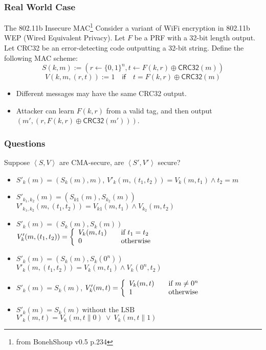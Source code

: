 \begin{frame}\frametitle{Real World Case}
\begin{exampleblock}{The 802.11b Insecure MAC\footnote{from 
BonehShoup v0.5 p.234}}
Consider a variant of WiFi encryption in 802.11b WEP (Wired Equivalent Privacy). Let $F$ be a PRF with a 32-bit length output. Let CRC32 be an error-detecting code outputting a 32-bit string. Define the following MAC scheme:
\[ S(k, m) := ( r \gets \{ 0,1 \}^n, t \gets F(k, r) \oplus \mathsf{CRC32}(m) )
\]
\[ V(k, m, (r, t)) := 1 \quad \mathsf{if} \quad t = F(k, r) \oplus \mathsf{CRC32}(m) 
\]
\begin{itemize}
\item Different messages may have the same CRC32 output.
\item Attacker can learn $F(k, r)$ from a valid tag, and then output $(m', (r, F(k, r) \oplus \mathsf{CRC32}(m')))$.
\end{itemize}
\end{exampleblock}
\end{frame}
\begin{frame}\frametitle{Questions}
\begin{exampleblock}{Suppose $\left<S, V\right>$ are CMA-secure,  are $\left<S', V'\right>$ secure?}
\begin{itemize}
\item $S'_{k}(m) = (S_{k}(m),m)$, 
$V'_{k}(m,(t_{1},t_{2})) = V_{k}(m,t_{1}) \land t_{2} = m$
\item $S'_{k_{1},k_{2}}(m) = (S_{k1}(m),S_{k_{2}}(m))$\\
$V'_{k_{1},k_{2}}(m,(t_{1},t_{2})) = V_{k1}(m,t_{1}) \land V_{k_{2}}(m,t_{2})$
\item $S'_{k}(m) = (S_{k}(m),S_{k}(m))$\\
$ V'_{k}(m,(t_{1},t_{2})) = \left\{
  \begin{array}{l l}
    V_{k}(m,t_{1}) & \quad \text{if $t_{1}=t_{2}$}\\
    0 & \quad \text{otherwise}\\
  \end{array} \right. $
\item $S'_{k}(m) = (S_{k}(m),S_{k}(0^{n}))$\\
$ V'_{k}(m,(t_{1},t_{2})) = V_{k}(m,t_{1}) \land  V_{k}(0^{n},t_{2})$
\item $S'_{k}(m) = S_{k}(m)$, 
$ V'_{k}(m,t) = \left\{ 
  \begin{array}{l l}
    V_{k}(m,t) & \quad \text{if $m \neq 0^{n}$}\\
    1 & \quad \text{otherwise}\\
  \end{array} \right. $
\item $S'_{k}(m) = S_{k}(m)\ \text{without the LSB}$ \\
$V'_{k}(m,t) = V_{k}(m,t\| 0)\ \lor \ V_{k}(m,t\| 1)$
\end{itemize}
\end{exampleblock}
\end{frame}

